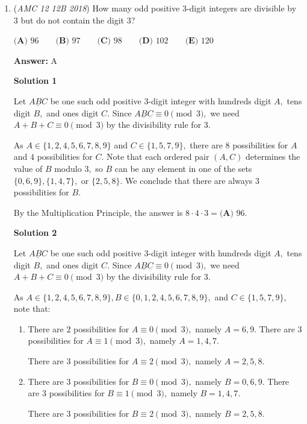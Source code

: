 \begin{enumerate}
 


	\item (\textit{AMC 12 12B 2018}) How many odd positive $3$-digit integers are divisible by $3$ but do not contain the digit $3$?


 $\textbf{(A) } 96 \qquad \textbf{(B) } 97 \qquad \textbf{(C) } 98 \qquad \textbf{(D) } 102 \qquad \textbf{(E) } 120$

 \textbf{Answer: }A



\textbf{Solution 1}

Let $\underline{ABC}$ be one such odd positive $3$-digit integer with hundreds digit $A,$ tens digit $B,$ and ones digit $C.$ Since $\underline{ABC}\equiv0\pmod3,$ we need $A+B+C\equiv0\pmod3$ by the divisibility rule for $3.$

 As $A\in\{1,2,4,5,6,7,8,9\}$ and $C\in\{1,5,7,9\},$ there are $8$ possibilities for $A$ and $4$ possibilities for $C.$ Note that each ordered pair $(A,C)$ determines the value of $B$ modulo $3,$ so $B$ can be any element in one of the sets $\{0,6,9\},\{1,4,7\},$ or $\{2,5,8\}.$ We conclude that there are always $3$ possibilities for $B.$

 By the Multiplication Principle, the answer is $8\cdot4\cdot3=\boxed{\textbf{(A) } 96}.$




\textbf{Solution 2}

Let $\underline{ABC}$ be one such odd positive $3$-digit integer with hundreds digit $A,$ tens digit $B,$ and ones digit $C.$ Since $\underline{ABC}\equiv0\pmod3,$ we need $A+B+C\equiv0\pmod3$ by the divisibility rule for $3.$

 As $A\in\{1,2,4,5,6,7,8,9\},B\in\{0,1,2,4,5,6,7,8,9\},$ and $C\in\{1,5,7,9\},$ note that:

 
            \begin{enumerate} 
        \item There are $2$ possibilities for $A\equiv0\pmod3,$ namely $A=6,9.$ There are $3$ possibilities for $A\equiv1\pmod3,$ namely $A=1,4,7.$ 

 There are $3$ possibilities for $A\equiv2\pmod3,$ namely $A=2,5,8.$
 
        \item There are $3$ possibilities for $B\equiv0\pmod3,$ namely $B=0,6,9.$ There are $3$ possibilities for $B\equiv1\pmod3,$ namely $B=1,4,7.$ 

 There are $3$ possibilities for $B\equiv2\pmod3,$ namely $B=2,5,8.$
 

\end{enumerate}
\end{enumerate}
